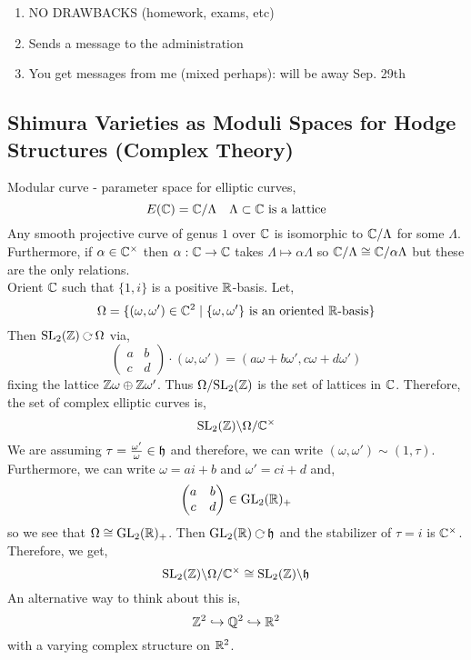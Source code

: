 \documentclass[12pt]{article}
\begin{document}
\begin{enumerate}
\item NO DRAWBACKS (homework, exams, etc)

\item Sends a message to the administration

\item You get messages from me (mixed perhaps): will be away Sep. 29th
\end{enumerate}

\subsection{Shimura Varieties as Moduli Spaces for Hodge Structures (Complex Theory)}

Modular curve - parameter space for elliptic curves,
\[ E(\mathbb{C}) = \mathbb{C} / \Lambda \quad \Lambda \subset \mathbb{C} \text{ is a lattice} \]
Any smooth projective curve of genus $1$ over $\mathbb{C}$ is isomorphic to $\mathbb{C} / \Lambda$ for some $\Lambda$. Furthermore, if $\alpha \in \mathbb{C}^\times$ then $\alpha : \mathbb{C} \to \mathbb{C}$ takes $\Lambda \mapsto \alpha \Lambda$ so $\mathbb{C} / \Lambda \cong \mathbb{C} / \alpha \Lambda$ but these are the only relations. 
\bigskip\\
Orient $\mathbb{C}$ such that $\{ 1, i \}$ is a positive $\mathbb{R}$-basis. Let,
\[ \Omega = \{ (\omega, \omega') \in \mathbb{C}^2 \mid \{ \omega, \omega' \} \text{ is an oriented } \mathbb{R}\text{-basis} \} \]
Then $\SL_2(\Z) \acts \Omega$ via,
\[ \begin{pmatrix}
a & b
\\
c & d
\end{pmatrix}
\cdot (\omega, \omega') = (a \omega + b \omega', c \omega + d \omega') \]
fixing the lattice $\mathbb{Z} \omega \oplus \mathbb{Z} \omega'$. Thus $\Omega / \mathrm{SL}_2(\mathbb{Z})$ is the set of lattices in $\mathbb{C}$. Therefore, the set of complex elliptic curves is,
\[ \mathrm{SL}_2(\mathbb{Z}) \backslash \Omega / \mathbb{C}^\times \]
We are assuming $\tau = \frac{\omega'}{\omega} \in \mathfrak{h}$ and therefore, we can write $(\omega, \omega') \sim (1, \tau)$. Furthermore, we can write $\omega = a i + b$ and $\omega' = c i + d$ and,
\[ \begin{pmatrix}
a & b 
\\
c & d
\end{pmatrix}
\in \mathrm{GL}_2(\mathbb{R})_+  \]
so we see that $\Omega \cong \mathrm{GL}_2(\mathbb{R})_+$. Then $\GL_2(\RR) \acts \h$ and the stabilizer of $\tau = i$ is $\mathbb{C}^\times$. Therefore, we get,
\[ \mathrm{SL}_2(\mathbb{Z}) \backslash \Omega / \mathbb{C}^\times \cong \mathrm{SL}_2(\mathbb{Z}) \backslash \mathfrak{h} \]
An alternative way to think about this is,
\[ \mathbb{Z}^2 \hookrightarrow \mathbb{Q}^2 \hookrightarrow \mathbb{R}^2 \]
with a varying complex structure on $\mathbb{R}^2$.
\end{document}
